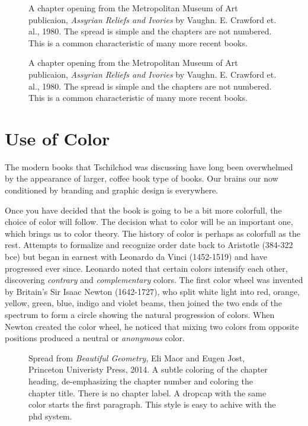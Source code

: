\begin{figure}[tbp]
\centering
\parindent=0pt
\par
\caption{A chapter opening from the Metropolitan Museum of Art publicaion, \textit{Assyrian Reliefs and Ivories} by Vaughn. E. Crawford et. al., 1980. The spread is simple and the chapters are not numbered. This is a common characteristic of many more recent books.}
\end{figure}


\begin{figure}[tbp]
\centering
\parindent=0pt
\par
\caption{A chapter opening from the Metropolitan Museum of Art publicaion, \textit{Assyrian Reliefs and Ivories} by Vaughn. E. Crawford et. al., 1980. The spread is simple and the chapters are not numbered. This is a common characteristic of many more recent books.}
\end{figure}


\section*{Use of Color}

The modern books that Tschilchod was discussing have long been overwhelmed by the appearance of larger, coffee book type of books. Our brains our now conditioned by branding and graphic design is everywhere. 

Once you have decided that the book is going to be a bit more colorfull, the choice of color will follow. The decision what to color will be an important one, which brings us to color theory. The history of color is perhaps as colorfull as the rest. Attempts to formalize and recognize order date back to Aristotle (384-322 bce) but began in earnest with Leonardo da Vinci (1452-1519) and have progressed ever since. Leonardo noted that certain colors intensify each other, discovering \textit{contrary} and \textit{complementary} colors. The first color wheel was invented by Britain's Sir Isaac Newton (1642-1727), who split white light into red, orange, yellow, green, blue, indigo and violet beams, then joined the two ends of the spectrum to form a circle showing the natural progression of colors. When Newton created the color wheel, he noticed that mixing two colors from opposite positions produced a neutral or \textit{anonymous} color.


\begin{figure}[htbp]
\parindent=0pt
\centering
{}
\caption{Spread from \textit{Beautiful Geometry}, Eli Maor and Eugen Jost, Princeton Univeristy Press, 2014. A subtle coloring of the chapter heading, de-emphasizing the chapter number and coloring the chapter title. There is no chapter label. A dropcap with the same color starts the first paragraph. This style is easy to achive with the phd system.}
\end{figure}



